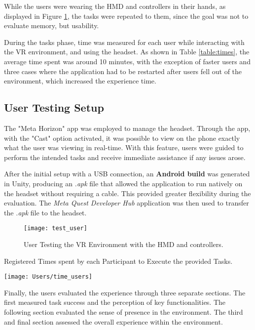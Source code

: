 While the users were wearing the \gls{HMD} and controllers in their hands, as displayed in Figure \ref{fig:user}, the tasks were repeated to them, since the goal was not to evaluate memory, but usability.

During the tasks phase, time was measured for each user while interacting with the \gls{VR} environment, and using the headset. 
As shown in Table \ref{table:times}, the average time spent was around 10 minutes, with the exception of faster users and three cases where the application had to be restarted after users fell out of the environment, which increased the experience time.

\subsection{User Testing Setup}
\label{sec:setup}

The "Meta Horizon" app was employed to manage the headset. Through the app, with the "Cast" option activated, it was possible to view on the phone exactly what the user was viewing in real-time. 
With this feature, users were guided to perform the intended tasks and receive immediate assistance if any issues arose. 

After the initial setup with a USB connection, an \textbf{Android build} was generated in Unity, producing an \emph{.apk} file that allowed the application to run natively on the headset without requiring a cable. 
This provided greater flexibility during the evaluation. 
The \emph{Meta Quest Developer Hub} application was then used to transfer the \emph{.apk} file to the headset.

\begin{figure}[h!]
    \centering
    \texttt{[image: test\_user]}
    \caption{User Testing the \gls{VR} Environment with the \gls{HMD} and controllers.} 
    \label{fig:user}
\end{figure}

\begin{table}[h!]
    \caption{Registered Times spent by each Participant to Execute the provided Tasks.} 
    \centering
    \texttt{[image: Users/time\_users]}
    \label{table:times}
\end{table}

Finally, the users evaluated the experience through three separate sections. The first measured task success and the perception of key functionalities.
The following section evaluated the sense of presence in the environment. The third and final section assessed the overall experience within the environment.

